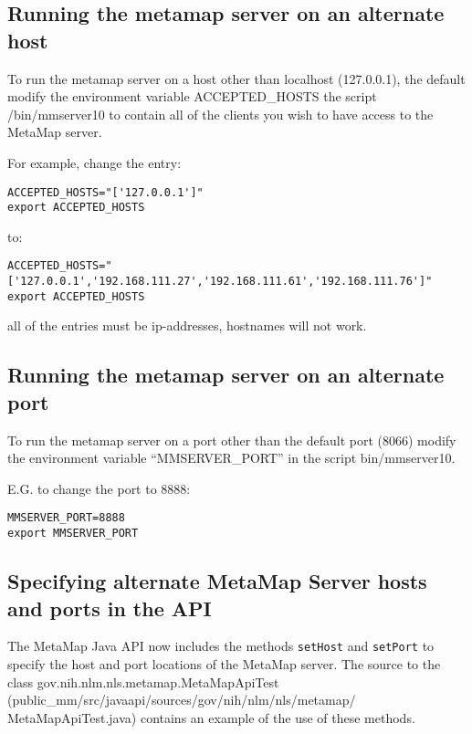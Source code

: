 \documentclass[11pt]{article}
\begin{document}
\subsection{Running the metamap server on an alternate host}
\label{Running the metamap server on an alternate host}

To run the metamap server on a host other than localhost (127.0.0.1),
the default modify the environment variable ACCEPTED\_HOSTS the script
/bin/mmserver10 to contain all of the clients you wish to have access
to the MetaMap server.


For example, change the entry:

\begin{verbatim}
ACCEPTED_HOSTS="['127.0.0.1']"
export ACCEPTED_HOSTS
\end{verbatim}

to:

\begin{verbatim}
ACCEPTED_HOSTS="['127.0.0.1','192.168.111.27','192.168.111.61','192.168.111.76']"
export ACCEPTED_HOSTS
\end{verbatim}

all of the entries must be ip-addresses, hostnames will not work.


\subsection{Running the  metamap server on an alternate port}
\label{Running the  metamap server on an alternate port}

To run the metamap server on a port other than the default port (8066)
modify the environment variable ``MMSERVER\_PORT'' in the script bin/mmserver10.


E.G. to change the port to 8888:

\begin{verbatim}
MMSERVER_PORT=8888
export MMSERVER_PORT
\end{verbatim}

\subsection{Specifying alternate MetaMap Server hosts and ports in the API}
\label{Specifying alternate MetaMap Server hosts and ports in the API}

The MetaMap Java API now includes the methods \texttt{setHost} and \texttt{setPort}
to specify the host and port locations of the MetaMap server.  The
source to the class gov.nih.nlm.nls.metamap.MetaMapApiTest
(public\_mm/src/javaapi/sources/gov/nih/nlm/nls/metamap/
MetaMapApiTest.java) contains an example of the use of these methods.
\end{document}
